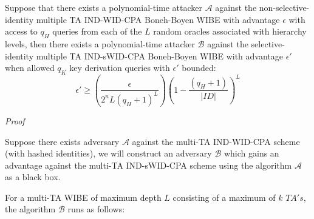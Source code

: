 \documentclass[10pt]{llncs}
\newcommand{\A}{\mathcal{A}}
\newcommand{\B}{\mathcal{B}}
\newcommand{\ID}{\mathit{ID}}
\newcommand{\TA}{\mathit{TA}}
\begin{document}
\begin{theorem}
Suppose that there exists a polynomial-time attacker $\A$ against the non-selective-identity multiple TA IND-WID-CPA Boneh-Boyen WIBE with advantage $\epsilon$ with access to $q_H$ queries from each of the $L$ random oracles associated with hierarchy levels, then there exists a polynomial-time attacker $\B$ against the selective-identity multiple TA IND-sWID-CPA Boneh-Boyen WIBE with advantage $\epsilon'$ when allowed $q_K$ key derivation queries with $\epsilon'$ bounded:
$$\epsilon' \ge \left(\frac{\epsilon}{2^n L (q_H + 1)^L}\right)\left(1 - \frac{(q_H + 1)}{|\mathcal{\ID}|}\right)^L$$
\end{theorem}
\emph{Proof}


Suppose there exists adversary $\A$ against the multi-TA IND-WID-CPA scheme (with hashed identities), we will construct an adversary $\B$ which gains an advantage against the multi-TA IND-sWID-CPA scheme using the algorithm $\A$ as a black box.

For a multi-TA WIBE of maximum depth $L$ consisting of a maximum of $k$ $\TA's$, the algorithm $\B$ runs as follows:
\end{document}
